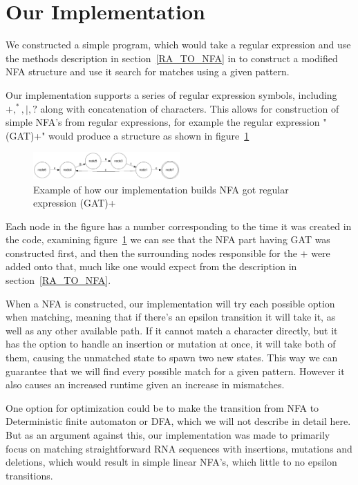 \section{Our Implementation}
We constructed  a simple program, which would take a regular expression and use the methods description in section~\ref{RA_TO_NFA} in to construct a modified NFA structure and use it search for matches using a given pattern.

Our implementation supports a series of regular expression symbols, including $+, ^*, |, ?$ along with concatenation of characters. This allows for construction of simple NFA's from regular expressions, for example the regular expression "(GAT)+" would produce a structure as shown in figure~\ref{fig:gat}

\begin{figure}[h!]
\centering
\includegraphics[width=0.5\textwidth]{lib/gat.png}
\caption{Example of how our implementation builds NFA got regular expression (GAT)+}
\label{fig:gat}
\end{figure}

Each node in the figure has a number corresponding to the time it was created in the code, examining figure~\ref{fig:gat} we can see that the NFA part having GAT was constructed first, and then the surrounding nodes responsible for the $+$ were added onto that, much like one would expect from the description in section~\ref{RA_TO_NFA}.

When a NFA is constructed, our implementation will try each possible option when matching, meaning that if there's an epsilon transition it will take it, as well as any other available path. If it cannot match a character directly, but it has the option to handle an insertion or mutation at once, it will take both of them, causing the unmatched state to spawn two new states. This way we can guarantee that we will find every possible match for a given pattern. However it also causes an increased runtime given an increase in mismatches.

One option for optimization could be to make the transition from NFA to Deterministic finite automaton or DFA, which we will not describe in detail here. But as an argument against this, our implementation was made to primarily focus on matching straightforward RNA sequences with insertions, mutations and deletions, which would result in simple linear NFA's, which little to no epsilon transitions. 